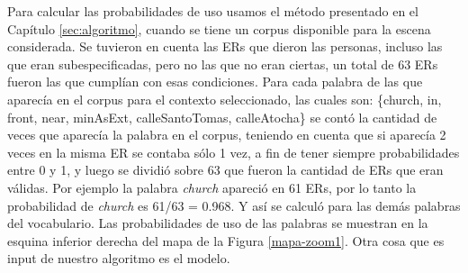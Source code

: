 
Para calcular las probabilidades de uso usamos el m\'etodo presentado en el Cap\'itulo \ref{sec:algoritmo}, cuando se tiene un corpus disponible para la escena considerada. Se tuvieron en cuenta las ERs que dieron las personas, incluso las que eran subespecificadas, pero no las que no eran ciertas, un total de 63 ERs fueron las que cumpl\'ian con esas condiciones. Para cada palabra de las que aparec\'ia en el corpus para el contexto seleccionado, las cuales son: \{church, in, front, near, minAsExt, calleSantoTomas, calleAtocha\} se cont\'o la cantidad de veces que aparec\'ia la palabra en el corpus, teniendo en cuenta que si aparec\'ia 2 veces en la misma ER se contaba s\'olo 1 vez, a fin de tener siempre probabilidades entre 0 y 1, y luego se dividi\'o sobre 63 que fueron la cantidad de ERs que eran v\'alidas. Por ejemplo la palabra {\it church} apareci\'o en 61 ERs, por lo tanto la probabilidad de {\it church} es 61/63 = 0.968. Y as\'i se calcul\'o para las dem\'as palabras del vocabulario. Las probabilidades de uso de las palabras se muestran en la esquina inferior derecha del mapa de la Figura \ref{mapa-zoom1}.
Otra cosa que es input de nuestro algoritmo es el modelo.\\

